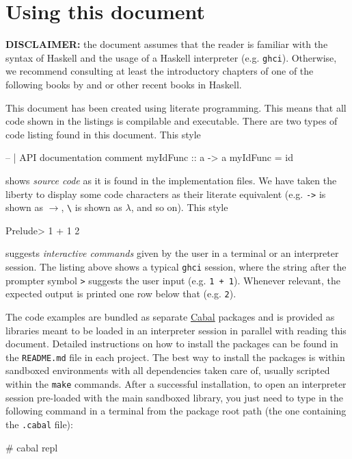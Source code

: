 \section{Using this document}
\label{sec:using-this-document}

\textbf{DISCLAIMER:} the document assumes that the reader is familiar with the syntax of Haskell and the usage of a Haskell interpreter (e.g. \texttt{ghci}). Otherwise, we recommend consulting at least the introductory chapters of one of the following books by \cite{Lipovaca11} and \cite{Hutton16} or other recent books in Haskell.

This document has been created using literate programming. This means that all code shown in the listings is compilable and executable. There are two types of code listing found in this document. This style
\begin{code}
-- | API documentation comment 
myIdFunc :: a -> a
myIdFunc = id
\end{code}
shows \emph{source code} as it is found in the implementation files. We have taken the liberty to display some code characters as their literate equivalent (e.g. \texttt{->} is shown as $\rightarrow$, \texttt{\textbackslash} is shown as $\lambda$, and so on). This style
\begin{interactive}
Prelude> 1 + 1
2
\end{interactive}
suggests \emph{interactive commands} given by the user in a terminal or an interpreter session. The listing above shows a typical \texttt{ghci} session, where the string after the prompter symbol \texttt{>} suggests the user input (e.g. \texttt{1 + 1}). Whenever relevant, the expected output is printed one row below that (e.g. \texttt{2}).

The code examples are bundled as separate \href{https://www.haskell.org/cabal/}{Cabal} packages and is provided as libraries meant to be loaded in an interpreter session in parallel with reading this document. Detailed instructions on how to install the packages can be found in the \texttt{README.md} file in each project. The best way to install the packages is within sandboxed environments with all dependencies taken care of, usually scripted within the \texttt{make} commands. After a successful installation, to open an interpreter session pre-loaded with the main sandboxed library, you just need to type in the following command in a terminal from the package root path (the one containing the \texttt{.cabal} file):
\begin{interactive}
# cabal repl
\end{interactive}

